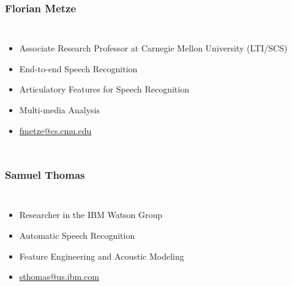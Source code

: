 \begin{frame}
  \frametitle{Florian Metze}
  \begin{columns}[T]
    \column{2in}
    \begin{itemize}
    \item Associate Research Professor at Carnegie Mellon University (LTI/SCS)
    \item End-to-end Speech Recognition
    \item Articulatory Features for Speech Recognition
    \item Multi-media Analysis
    \item \href{mailto:fmetze@cs.cmu.edu}{fmetze@cs.cmu.edu}
    \end{itemize}
    \column{2in}
  \end{columns}
\end{frame}

\begin{frame}
  \frametitle{Samuel Thomas}
  \begin{columns}[T]
    \column{2in}
    \begin{itemize}
    \item Researcher in the IBM Watson Group
    \item Automatic Speech Recognition
    \item Feature Engineering and Acoustic Modeling
    \item \href{mailto:sthomas@us.ibm.com}{sthomas@us.ibm.com}
    \end{itemize}
    \column{2in}
  \end{columns}
\end{frame}

